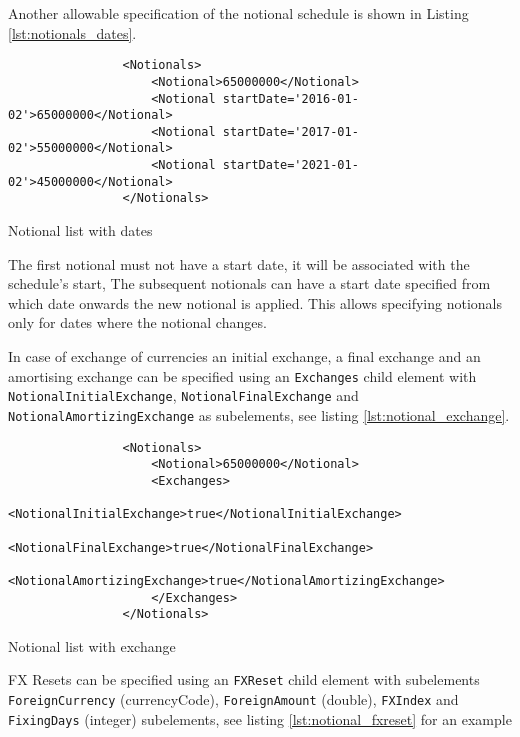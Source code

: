 \begin{itemize}
Another allowable specification of the notional schedule is shown in Listing \ref{lst:notionals_dates}. 
\begin{listing}[H]
\begin{verbatim}
                <Notionals>
                    <Notional>65000000</Notional>
                    <Notional startDate='2016-01-02'>65000000</Notional>
                    <Notional startDate='2017-01-02'>55000000</Notional>
                    <Notional startDate='2021-01-02'>45000000</Notional>
                </Notionals>
\end{verbatim}
\caption{Notional list with dates}
\label{lst:notionals_dates}
\end{listing}
The first notional must not have a start date, it will be associated
with the schedule's start, The subsequent notionals can have a start
date specified from which date onwards the new notional is applied. This allows
specifying notionals only for dates where the notional changes. 

\vspace{1em} 

In case of exchange of currencies an initial exchange, a final exchange
and an amortising exchange can be specified using an \lstinline!Exchanges! child element with \break
\lstinline!NotionalInitialExchange!, \lstinline!NotionalFinalExchange! and \break
\lstinline!NotionalAmortizingExchange! as subelements, see listing
\ref{lst:notional_exchange}.

\begin{listing}[H]
\begin{verbatim}
                <Notionals>
                    <Notional>65000000</Notional>
                    <Exchanges>
                      <NotionalInitialExchange>true</NotionalInitialExchange>
                      <NotionalFinalExchange>true</NotionalFinalExchange>
                      <NotionalAmortizingExchange>true</NotionalAmortizingExchange>
                    </Exchanges>
                </Notionals>
\end{verbatim}
\caption{Notional list with exchange}
\label{lst:notional_exchange}
\end{listing}

FX Resets can be specified using an \lstinline!FXReset! child element with subelements \break
\lstinline!ForeignCurrency! (currencyCode), \lstinline!ForeignAmount! (double), \lstinline!FXIndex! and \break
\lstinline!FixingDays! (integer) subelements, see listing
\ref{lst:notional_fxreset} for an example


\end{itemize}
